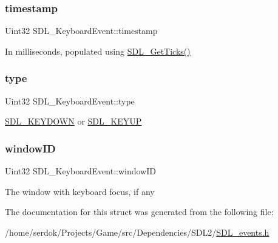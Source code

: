 \subsubsection{\texorpdfstring{timestamp}{timestamp}}
{\footnotesize\ttfamily Uint32 S\+D\+L\+\_\+\+Keyboard\+Event\+::timestamp}

In milliseconds, populated using \hyperlink{SDL__timer_8h_a0b9bc71d6287e0ffafdc3419760fe2b3}{S\+D\+L\+\_\+\+Get\+Ticks()} \mbox{\label{structSDL__KeyboardEvent_ae0b2f2aace6f80c1f47e5a14350d409a}} 
\subsubsection{\texorpdfstring{type}{type}}
{\footnotesize\ttfamily Uint32 S\+D\+L\+\_\+\+Keyboard\+Event\+::type}

\hyperlink{SDL__events_8h_a3b589e89be6b35c02e0dd34a55f3fccaacaf8cfd53c985cdbf6a90c811d51a1fc}{S\+D\+L\+\_\+\+K\+E\+Y\+D\+O\+WN} or \hyperlink{SDL__events_8h_a3b589e89be6b35c02e0dd34a55f3fccaadefb8866b9d28be21c2c33c35cc66c4b}{S\+D\+L\+\_\+\+K\+E\+Y\+UP} \mbox{\label{structSDL__KeyboardEvent_a56efb6780b96acd5b50d8f797efb3546}} 
\subsubsection{\texorpdfstring{window\+ID}{windowID}}
{\footnotesize\ttfamily Uint32 S\+D\+L\+\_\+\+Keyboard\+Event\+::window\+ID}

The window with keyboard focus, if any 

The documentation for this struct was generated from the following file\+:\begin{DoxyCompactItemize}
\item 
/home/serdok/\+Projects/\+Game/src/\+Dependencies/\+S\+D\+L2/\hyperlink{SDL__events_8h}{S\+D\+L\+\_\+events.\+h}\end{DoxyCompactItemize}
